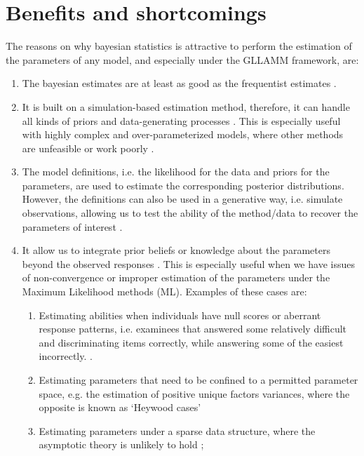\section{Benefits and shortcomings}

The reasons on why bayesian statistics is attractive to perform the estimation of the parameters of any model, and especially under the GLLAMM framework, are:

\begin{enumerate}
	\item The bayesian estimates are at least as good as the frequentist estimates \cite{Baker_1998, Wollack_2002, Hsieh_2010}. 
	
	\item It is built on a simulation-based estimation method, therefore, it can handle all kinds of priors and data-generating processes \cite{Fox_2010}. This is especially useful with highly complex and over-parameterized models, where other methods are unfeasible or work poorly \cite{Baker_1998, Kim_1999}. 
	
	\item The model definitions, i.e. the likelihood for the data and priors for the parameters, are used to estimate the corresponding posterior distributions. However, the definitions can also be used in a generative way, i.e. simulate observations, allowing us to test the ability of the method/data to recover the parameters of interest \cite{McElreath_2020}.
	
	\item It allow us to integrate prior beliefs or knowledge about the parameters beyond the observed responses \cite{Fox_2010, Skrondal_et_al_2004a}. This is especially useful when we have issues of non-convergence or improper estimation of the parameters under the Maximum Likelihood methods (ML). Examples of these cases are:
	
	\begin{enumerate}
		\item Estimating abilities when individuals have null scores or aberrant response patterns, i.e. examinees that answered some relatively difficult and discriminating items correctly, while answering some of the easiest incorrectly. \cite{Hambleton_et_al_1991a, Azevedo_2003}.
		
		\item Estimating parameters that need to be confined to a permitted parameter space, e.g. the estimation of positive unique factors variances, where the opposite is known as ‘Heywood cases’ \cite{Martin_et_al_1975}
		
		\item Estimating parameters under a sparse data structure, where the asymptotic theory is unlikely to hold \cite{Fox_2010};
		
	\end{enumerate}
	
\end{enumerate}

